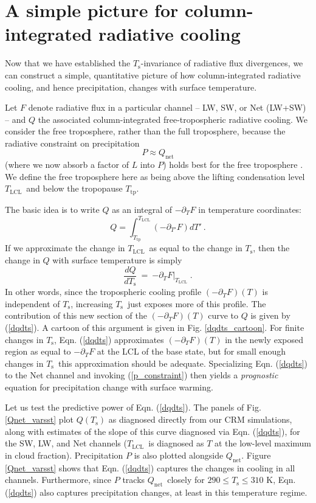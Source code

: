 \documentclass[10pt]{article}
\newcommand{\beqn}{\begin{equation}}
\newcommand{\eeqn}{\end{equation}}
\newcommand{\eqnref}[1]{(\ref{#1})}
\newcommand{\n}{\nonumber}
\newcommand{\der}[2]{\ensuremath{\frac{d #1}{d #2}}}
\newcommand{\ppt}{\ensuremath{\partial_T}}
\newcommand{\Qnet}{\ensuremath{Q_\mathrm{net}}}
\newcommand{\Ts}{\ensuremath{T_\mathrm{s}}}
\newcommand{\Tlcl}{\ensuremath{T_\mathrm{LCL}}}
\newcommand{\Ttp}{\ensuremath{T_\mathrm{tp}}}
\begin{document}
\section{A simple picture for column-integrated radiative cooling} \label{sec_simple_Q}

Now that we have established  the \Ts-invariance of radiative flux divergences, we can construct a simple, quantitative picture of how column-integrated radiative cooling, and hence precipitation,  changes with surface temperature. 
	
	Let $F$ denote radiative flux in a particular channel -- LW, SW, or Net (LW+SW) -- and $Q$ the associated column-integrated free-tropospheric radiative cooling. We consider  the free troposphere, rather than the full troposphere, because the radiative constraint on precipitation 
		\beqn
			P \approx \Qnet
		\label{p_constraint}
		\eeqn
		 (where we now absorb a factor of $L$ into $P$) holds best for the free troposphere  \citep{ogorman2012}. We define the free troposphere here as being above the lifting condensation level \Tlcl\ and below the tropopause \Ttp.
	
	  The basic idea is to write $Q$ as an integral of $-\ppt F$  in temperature coordinates: 
	\beqn
		Q =  \int_{\Ttp}^{\Tlcl} (-\partial_{T'} F) dT' \ . 
		\n
	\eeqn
   If we approximate the change in  \Tlcl\ as equal to the change in \Ts, then the change in $Q$ with surface temperature is  simply
	\beqn
		\der{Q}{\Ts} \ =\  \left.  -\ppt F\right|_{\Tlcl}  \; .
	\label{dqdts}
	\eeqn
In other words, since the tropospheric cooling profile $(-\ppt F)(T)$  is independent of \Ts, increasing \Ts\ just exposes more of this profile.  The contribution of this new section of the $(-\ppt F)(T)$ curve to $Q$ is given by \eqnref{dqdts}.  A cartoon of this argument is given in Fig. \ref{dqdts_cartoon}. For finite changes in \Ts, Eqn. \eqnref{dqdts} approximates $(-\ppt F)(T)$ in the newly exposed region as equal to $-\ppt F$ at the LCL of the base state, but for small enough changes in \Ts\ this approximation should be adequate. Specializing Eqn. \eqnref{dqdts} to the Net channel and invoking \eqnref{p_constraint} then yields a \emph{prognostic} equation for precipitation change with surface warming.

Let us test the predictive power of Eqn. \eqnref{dqdts}. The panels of Fig. \ref{Qnet_varsst} plot $Q(\Ts)$ as diagnosed directly from our CRM simulations, along with estimates of the slope of this curve diagnosed via  Eqn. \eqnref{dqdts}, for the SW, LW, and Net  channels (\Tlcl\ is diagnosed as $T$ at the low-level maximum in cloud fraction). Precipitation $P$ is also plotted alongside $\Qnet$.  Figure \ref{Qnet_varsst} shows that  Eqn. \eqnref{dqdts}  captures the changes in  cooling in all channels. Furthermore, since $P$ tracks \Qnet\ closely for $290\leq \Ts \leq 310$ K, Eqn. \eqnref{dqdts} also captures precipitation changes, at least in this temperature regime.
\end{document}
